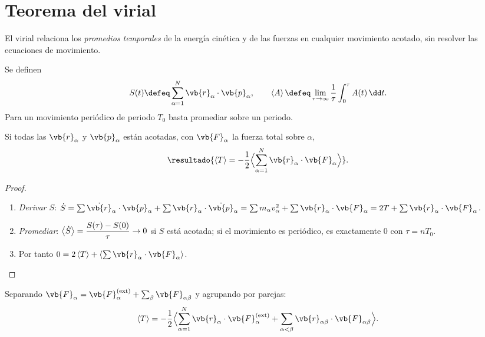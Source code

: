 \section{Teorema del virial}
\label{sec:virial}

El virial relaciona los \emph{promedios temporales} de la energía cinética y
de las fuerzas en cualquier movimiento acotado, sin resolver las ecuaciones
de movimiento.

\begin{definicion}
Se definen
\begin{equation}
  S(t)\defeq\sa\vb{r}_{\alpha}\cdot\vb{p}_{\alpha},
  \qquad
  \prom{A}\defeq\lim_{\tau\to\infty}\frac1\tau\int_{0}^{\tau}A(t)\,\dd t .
\end{equation}
Para un movimiento periódico de periodo $T_{0}$ basta promediar sobre un periodo.
\end{definicion}

\begin{teorema}
\label{teo:virial}
Si todas las $\vb{r}_{\alpha}$ y $\vb{p}_{\alpha}$ están acotadas, con
$\vb{F}_{\alpha}$ la fuerza total sobre $\alpha$,
\begin{equation}
  \resultado{\prom{T}=-\frac12\Bigl\langle\sa\vb{r}_{\alpha}\cdot\vb{F}_{\alpha}\Bigr\rangle} .
  \label{eq:virial}
\end{equation}
\end{teorema}

\begin{proof}
\begin{enumerate}
  \item \emph{Derivar $S$}:
  $\dot S=\sum\dot{\vb{r}}_{\alpha}\cdot\vb{p}_{\alpha}+\sum\vb{r}_{\alpha}\cdot\dot{\vb{p}}_{\alpha}
  =\sum m_{\alpha}v_{\alpha}^{2}+\sum\vb{r}_{\alpha}\cdot\vb{F}_{\alpha}=2T+\sum\vb{r}_{\alpha}\cdot\vb{F}_{\alpha}$.
  \item \emph{Promediar}:
  $\left\langle \dot S\right\rangle=\dfrac{S(\tau)-S(0)}{\tau}\to0$ si $S$ está acotada; si el movimiento
  es periódico, es exactamente $0$ con $\tau=nT_{0}$.
  \item Por tanto $0=2\prom{T}+\prom{\sum\vb{r}_{\alpha}\cdot\vb{F}_{\alpha}}$.\qedhere
\end{enumerate}
\end{proof}

\begin{observacion}
Separando $\vb{F}_{\alpha}=\vb{F}_{\alpha}\ext+\sum_{\beta}\vb{F}_{\alpha\beta}$ y agrupando por parejas:
\begin{equation}
  \prom{T}=-\frac12\Bigl\langle\sa\vb{r}_{\alpha}\cdot\vb{F}_{\alpha}\ext+\sab\vb{r}_{\alpha\beta}\cdot\vb{F}_{\alpha\beta}\Bigr\rangle .
\end{equation}
\end{observacion}


